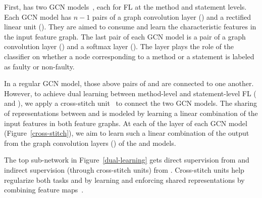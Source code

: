 
 First, {\tool}
has two GCN models~\cite{kipf2016semi}, each for FL at the method and
statement levels. Each GCN model has $n-1$ pairs of a graph
convolution layer () and a rectified linear unit
(). They are aimed to consume and learn the characteristic
features in the input feature graph. The last pair of each GCN model
is a pair of a graph convolution layer () and a softmax
layer (). The  layer plays the role of the
classifier on whether a node corresponding to a method or a statement
is labeled as faulty or non-faulty.

 In a regular GCN
model, those above pairs of  and  are connected
to one another. However, to achieve dual learning between method-level
and state\-ment-level FL ( and ), we apply a
cross-stitch unit~\cite{misra2016cross} to connect the two GCN
models. The sharing of representations between  and
 is modeled by learning a linear combination of the input
features in both feature graphs. At each of the  layer of
each GCN model (Figure~\ref{cross-stitch}), we aim to learn such a
linear combination of the output from the graph convolution layers
() of the  and  models.

The top sub-network in Figure~\ref{dual-learning} gets direct
supervision from  and indirect supervision (through
cross-stitch units) from . Cross-stitch units help
regularize both tasks  and  by learning and
enforcing shared representations by combining feature
maps~\cite{misra2016cross}.



